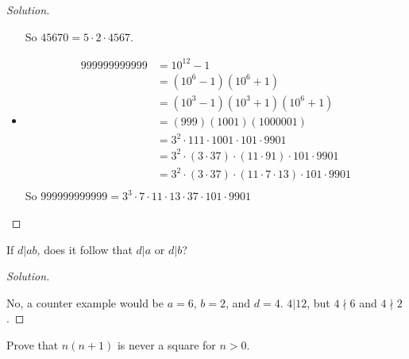 \documentclass[11pt]{article}
\newenvironment{problem}[2][Problem]{\begin{trivlist}
\item[\hskip \labelsep {\bfseries #1}\hskip \labelsep {\bfseries #2.}]}{\end{trivlist}}
\newenvironment{solution}
  {\renewcommand\qedsymbol{$~$}\begin{proof}[Solution]$ $\par\nobreak\ignorespaces}
  {\end{proof}}
\begin{document}
\begin{solution}
\begin{itemize}
          So $45670=5\cdot2\cdot4567$.
    \item[999999999999:]
          \begin{align*}
            999999999999 & = 10^12 - 1                                                              \\
                         & = (10^6-1)(10^6+1)                                                       \\
                         & = (10^3-1)(10^3+1)(10^6+1)                                               \\
                         & = (999)(1001)(1000001)                                                   \\
                         & = 3^2 \cdot 111 \cdot 1001 \cdot 101 \cdot 9901                          \\
                         & = 3^2 \cdot (3\cdot 37) \cdot (11 \cdot 91) \cdot 101 \cdot 9901         \\
                         & = 3^2 \cdot (3\cdot 37) \cdot (11 \cdot 7 \cdot 13) \cdot 101 \cdot 9901 \\
          \end{align*}
          So $999999999999 = 3^3 \cdot 7 \cdot 11\cdot 13 \cdot 37 \cdot 101 \cdot 9901$
  \end{itemize}
\end{solution}



\begin{problem}{8}
If $d|ab$, does it follow that $d|a$ or $d|b$?
\end{problem}

\begin{solution}
  No, a counter example would be $a=6$, $b=2$, and $d=4$. $4|12$, but $4\nmid 6$ and $4\nmid 2$.
\end{solution}



\begin{problem}{10}
Prove that $n(n+1)$ is never a square for $n>0$.
\end{problem}
\end{document}
